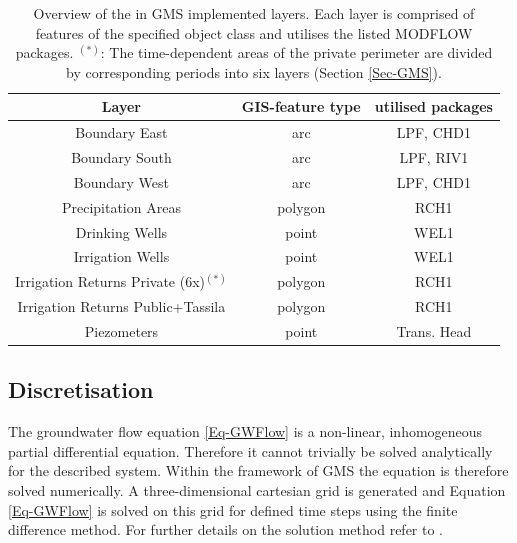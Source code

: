 \begin{table}[h]
    \centering
    \caption{Overview of the in GMS implemented layers. Each layer is comprised of features of the specified object class and utilises the listed MODFLOW packages. $^{(*)}$: The time-dependent areas of the private perimeter are divided by corresponding periods into six layers (Section \ref{Sec-GMS}).}
    \label{Tab-GMSLayersOV}
    \begin{tabular}{ccc}
        Layer                                   & GIS-feature type & utilised packages \\ \hline
        Boundary East                           & arc              & LPF, CHD1         \\
        Boundary South                          & arc              & LPF, RIV1         \\
        Boundary West                           & arc              & LPF, CHD1         \\
        Precipitation Areas                     & polygon          & RCH1              \\
        Drinking Wells                          & point            & WEL1              \\
        Irrigation Wells                        & point            & WEL1              \\
        Irrigation Returns Private (6x)$^{(*)}$ & polygon          & RCH1              \\
        Irrigation Returns Public+Tassila       & polygon          & RCH1              \\
        Piezometers                             & point            & Trans. Head      
        \end{tabular}
\end{table}


\subsection{Discretisation}
\label{Sec-Discretisation}

The groundwater flow equation \eqref{Eq-GWFlow} is a non-linear, inhomogeneous partial differential equation. Therefore it cannot trivially be solved analytically for the described system. Within the framework of GMS the equation is therefore solved numerically. A three-dimensional cartesian grid is generated and Equation \eqref{Eq-GWFlow} is solved on this grid for defined time steps using the finite difference method. For further details on the solution method refer to \textcite{Harbaugh.2000}.

